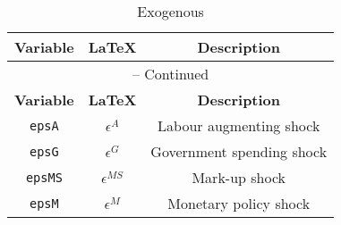 \begin{center}
\begin{longtable}{ccc}
\caption{Exogenous}\\%
\hline%
\multicolumn{1}{c}{\textbf{Variable}} &
\multicolumn{1}{c}{\textbf{\LaTeX}} &
\multicolumn{1}{c}{\textbf{Description}}\\%
\hline\hline%
\endfirsthead
\multicolumn{3}{c}{{\tablename} \thetable{} -- Continued}\\%
\hline%
\multicolumn{1}{c}{\textbf{Variable}} &
\multicolumn{1}{c}{\textbf{\LaTeX}} &
\multicolumn{1}{c}{\textbf{Description}}\\%
\hline\hline%
\endhead
\texttt{epsA} & ${\epsilon^{A}}$ & Labour augmenting shock\\
\texttt{epsG} & ${\epsilon^{G}}$ & Government spending shock\\
\texttt{epsMS} & ${\epsilon^{MS}}$ & Mark-up shock\\
\texttt{epsM} & ${\epsilon^{M}}$ & Monetary policy shock\\
\hline%
\end{longtable}
\end{center}

